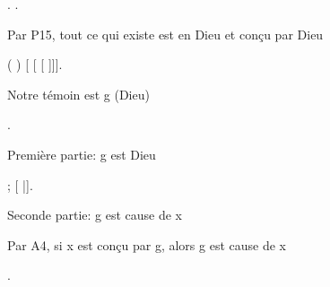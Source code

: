 \documentclass[10pt]{report}
\begin{document}
\begin{coqdoccode}
\coqdocnoindent
{}.\coqdoceol
\coqdocindent{1.00em}
 .\coqdoceol
\coqdocemptyline
\coqdocindent{1.00em}
\begin{coqdoccomment}
\coqdocindent{0.50em}
Par\coqdocindent{0.50em}
P15,\coqdocindent{0.50em}
tout\coqdocindent{0.50em}
ce\coqdocindent{0.50em}
qui\coqdocindent{0.50em}
existe\coqdocindent{0.50em}
est\coqdocindent{0.50em}
en\coqdocindent{0.50em}
Dieu\coqdocindent{0.50em}
et\coqdocindent{0.50em}
conçu\coqdocindent{0.50em}
par\coqdocindent{0.50em}
Dieu\coqdocindent{0.50em}
\end{coqdoccomment}
\coqdoceol
\coqdocindent{1.00em}
  ( )  [ [ [ ]]].\coqdoceol
\coqdocemptyline
\coqdocindent{1.00em}
\begin{coqdoccomment}
\coqdocindent{0.50em}
Notre\coqdocindent{0.50em}
témoin\coqdocindent{0.50em}
est\coqdocindent{0.50em}
g\coqdocindent{0.50em}
(Dieu)\coqdocindent{0.50em}
\end{coqdoccomment}
\coqdoceol
\coqdocindent{1.00em}
\coqdoctac{\ensuremath{\exists}} .\coqdoceol
\coqdocemptyline
\coqdocindent{1.00em}
\begin{coqdoccomment}
\coqdocindent{0.50em}
Première\coqdocindent{0.50em}
partie:\coqdocindent{0.50em}
g\coqdocindent{0.50em}
est\coqdocindent{0.50em}
Dieu\coqdocindent{0.50em}
\end{coqdoccomment}
\coqdoceol
\coqdocindent{1.00em}
; [ |].\coqdoceol
\coqdocemptyline
\coqdocindent{1.00em}
\begin{coqdoccomment}
\coqdocindent{0.50em}
Seconde\coqdocindent{0.50em}
partie:\coqdocindent{0.50em}
g\coqdocindent{0.50em}
est\coqdocindent{0.50em}
cause\coqdocindent{0.50em}
de\coqdocindent{0.50em}
x\coqdocindent{0.50em}
\end{coqdoccomment}
\coqdoceol
\coqdocindent{1.00em}
\begin{coqdoccomment}
\coqdocindent{0.50em}
Par\coqdocindent{0.50em}
A4,\coqdocindent{0.50em}
si\coqdocindent{0.50em}
x\coqdocindent{0.50em}
est\coqdocindent{0.50em}
conçu\coqdocindent{0.50em}
par\coqdocindent{0.50em}
g,\coqdocindent{0.50em}
alors\coqdocindent{0.50em}
g\coqdocindent{0.50em}
est\coqdocindent{0.50em}
cause\coqdocindent{0.50em}
de\coqdocindent{0.50em}
x\coqdocindent{0.50em}
\end{coqdoccomment}
\coqdoceol
\coqdocindent{1.00em}
 .\coqdoceol

\end{coqdoccode}
\end{document}
